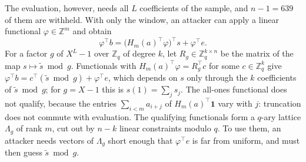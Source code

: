 \documentclass[11pt,a4paper]{article}
\theoremstyle{definition}
\newcommand{\Z}{\mathbb{Z}}
\newcommand{\Zq}{\mathbb{Z}_q}
\begin{document}
The evaluation, however, needs all $L$ coefficients of the sample, and $n - 1 = 639$ of them are withheld. With only the window, an attacker can apply a linear functional $\varphi \in \Z^m$ and obtain
\[
\varphi^{\top} b = \bigl(H_m(a)^{\top} \varphi\bigr)^{\top} s + \varphi^{\top} e .
\]
For a factor $g$ of $X^L - 1$ over $\Zq$ of degree $k$, let $R_g \in \Zq^{k \times n}$ be the matrix of the map $s \mapsto \tilde{s} \bmod g$. Functionals with $H_m(a)^{\top}\varphi = R_g^{\top} c$ for some $c \in \Zq^k$ give $\varphi^{\top} b = c^{\top}(\tilde{s} \bmod g) + \varphi^{\top} e$, which depends on $s$ only through the $k$ coefficients of $\tilde{s} \bmod g$; for $g = X - 1$ this is $s(1) = \sum_j s_j$. The all-ones functional does not qualify, because the entries $\sum_{i<m} a_{i+j}$ of $H_m(a)^{\top}\mathbf{1}$ vary with $j$: truncation does not commute with evaluation. The qualifying functionals form a $q$-ary lattice $\Lambda_g$ of rank $m$, cut out by $n - k$ linear constraints modulo $q$. To use them, an attacker needs vectors of $\Lambda_g$ short enough that $\varphi^{\top} e$ is far from uniform, and must then guess $\tilde{s} \bmod g$.
\end{document}
